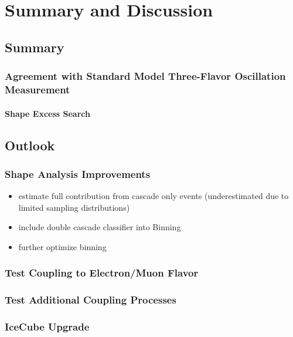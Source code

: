\setchapterpreamble[u]{\margintoc}

\chapter{Summary and Discussion}



\section{Summary}

\subsection{Agreement with Standard Model Three-Flavor Oscillation Measurement}

\subsubsection{Shape Excess Search}



\section{Outlook}

\subsection{Shape Analysis Improvements}

\begin{itemize}
    \item estimate full contribution from cascade only events (underestimated due to limited sampling distributions)
    \item include double cascade classifier into Binning
    \item further optimize binning
\end{itemize}

\subsection{Test Coupling to Electron/Muon Flavor}

\subsection{Test Additional Coupling Processes}

\subsection{IceCube Upgrade}
